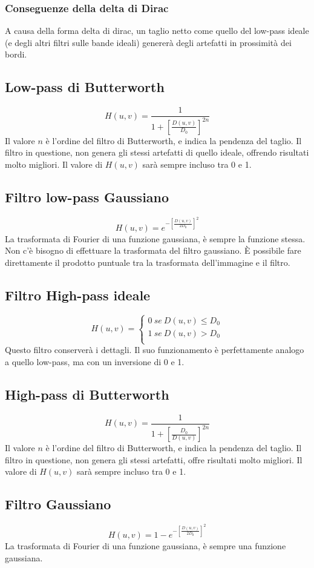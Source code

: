 \documentclass{report}
\begin{document}
	\subsubsection{Conseguenze della delta di Dirac}
	A causa della forma delta di dirac, un taglio netto come quello del low-pass ideale (e degli altri filtri sulle bande ideali) genererà degli artefatti in prossimità dei bordi.
	
	\subsection{Low-pass di Butterworth}
	$$
	H(u,v) = \frac{1}{1+\left[ \frac{D(u,v)}{D_0}\right]^{2n}}
	$$
	Il valore $n$ è l'ordine del filtro di Butterworth, e indica la pendenza del taglio.
	Il filtro in questione, non genera gli stessi artefatti di quello ideale, offrendo risultati molto migliori.
	Il valore di $H(u,v)$ sarà sempre incluso tra 0 e 1.
	\subsection{Filtro low-pass Gaussiano}
	$$
	H(u,v) = e^{-\left[\frac{D(u,v)}{2D_0}\right]^2}
	$$
	La trasformata di Fourier di una funzione gaussiana, è sempre la funzione stessa. Non c'è bisogno di effettuare la trasformata del filtro gaussiano. È possibile fare direttamente il prodotto puntuale tra la trasformata dell'immagine e il filtro.
	\subsection{Filtro High-pass ideale}
	$$
	H(u,v) = \begin{cases}
	0 \ se \ D(u,v) \leq D_0\\
	1 \ se \ D(u,v) > D_0\\
	\end{cases}
	$$
	Questo filtro conserverà i dettagli. Il suo funzionamento è perfettamente analogo a quello low-pass, ma con un inversione di 0 e 1.
	\subsection{High-pass di Butterworth}
	$$
	H(u,v) = \frac{1}{1+\left[ \frac{D_0}{D(u,v)}\right]^{2n}}
	$$
	Il valore $n$ è l'ordine del filtro di Butterworth, e indica la pendenza del taglio.
	Il filtro in questione, non genera gli stessi artefatti, offre risultati molto migliori.
	Il valore di $H(u,v)$ sarà sempre incluso tra 0 e 1.
	\subsection{Filtro Gaussiano}
	$$
	H(u,v) = 1-e^{-\left[\frac{D(u,v)}{2D_0}\right]^2}
	$$
	La trasformata di Fourier di una funzione gaussiana, è sempre una funzione gaussiana.
	
\end{document}
